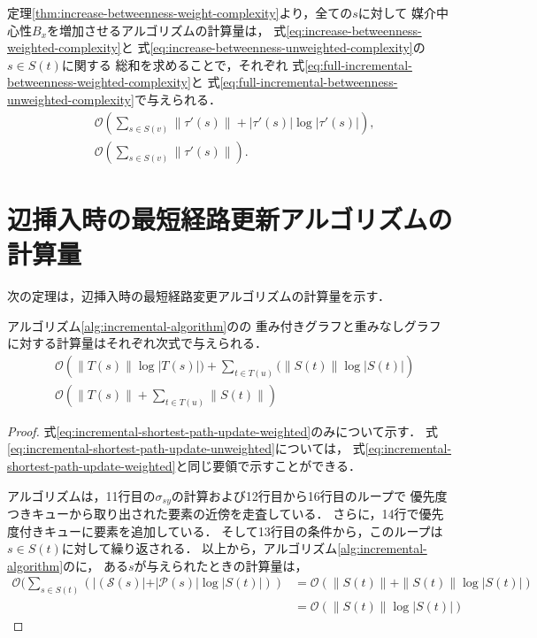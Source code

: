 定理\ref{thm:increase-betweenness-weight-complexity}より，全ての$s$に対して
媒介中心性$B_x$を増加させるアルゴリズムの計算量は，
式\eqref{eq:increase-betweenness-weighted-complexity}と
式\eqref{eq:increase-betweenness-unweighted-complexity}の$s\in S(t)$に関する
総和を求めることで，それぞれ
式\eqref{eq:full-incremental-betweenness-weighted-complexity}と
式\eqref{eq:full-incremental-betweenness-unweighted-complexity}で与えられる．
\begin{align}
  &\mathcal{O}\left(\sum_{s\in S(v)}\|\tau'(s)\|+|\tau'(s)|\log|\tau'(s)|\right),
  \label{eq:full-incremental-betweenness-weighted-complexity} \\
  &\mathcal{O}\left(\sum_{s\in S(v)}\|\tau'(s)\|\right).
  \label{eq:full-incremental-betweenness-unweighted-complexity}
\end{align}

\section{辺挿入時の最短経路更新アルゴリズムの計算量}
次の定理は，辺挿入時の最短経路変更アルゴリズムの計算量を示す．

\begin{theorem}
  \label{thm:incremental-shortest-path-update}
  アルゴリズム\ref{alg:incremental-algorithm}のの
  重み付きグラフと重みなしグラフに対する計算量はそれぞれ次式で与えられる．
  \begin{align}
    &\mathcal{O}\left(\|T(s)\|\log|T(s)|)+\sum_{t\in T(u)}(\|S(t)\|\log|S(t)|\right)
    \label{eq:incremental-shortest-path-update-weighted} \\
    &\mathcal{O}\left(\|T(s)\|+\sum_{t\in T(u)}\|S(t)\|\right)
    \label{eq:incremental-shortest-path-update-unweighted}
  \end{align}
\end{theorem}
\begin{proof}
  式\eqref{eq:incremental-shortest-path-update-weighted}のみについて示す．
  式\eqref{eq:incremental-shortest-path-update-unweighted}については，
  式\eqref{eq:incremental-shortest-path-update-weighted}と同じ要領で示すことができる．

  アルゴリズムは，11行目の$\sigma_{sy}$の計算および12行目から16行目のループで
  優先度つきキューから取り出された要素の近傍を走査している．
  さらに，14行で優先度付きキューに要素を追加している．
  そして13行目の条件から，このループは$s\in S(t)$に対して繰り返される．
  以上から，アルゴリズム\ref{alg:incremental-algorithm}のに，
  ある$s$が与えられたときの計算量は，
  \begin{equation*}
    \begin{aligned}
      \mathcal{O}(\sum_{s\in S(t)}(|(\mathcal{S}(s)|+|\mathcal{P}(s)|\log|S(t)|))
      &=\mathcal{O}(\|S(t)\|+\|S(t)\|\log|S(t)|) \\
      &=\mathcal{O}(\|S(t)\|\log|S(t)|)
    \end{aligned}
  \end{equation*}
\end{proof}

